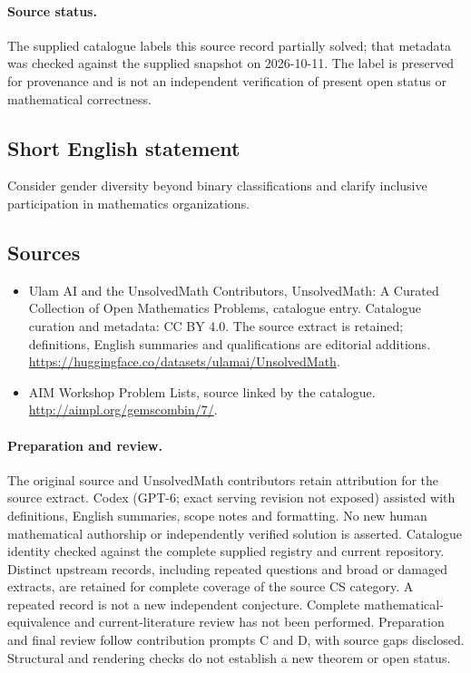 \documentclass[11pt]{article}
\begin{document}
\paragraph{Source status.}
The supplied catalogue labels this source record partially solved; that metadata was checked against the supplied snapshot on 2026-10-11. The label is preserved for provenance and is not an independent verification of present open status or mathematical correctness.
\subsection{Short English statement}
Consider gender diversity beyond binary classifications and clarify inclusive participation in mathematics organizations.
\subsection{Sources}
\begin{itemize}
\item[\hypertarget{source:statement:1}{S1}] Ulam AI and the UnsolvedMath Contributors, UnsolvedMath: A Curated Collection of Open Mathematics Problems, catalogue entry. Catalogue curation and metadata: CC BY 4.0. The source extract is retained; definitions, English summaries and qualifications are editorial additions.
\url{https://huggingface.co/datasets/ulamai/UnsolvedMath}.
\item[\hypertarget{source:statement:2}{S2}] AIM Workshop Problem Lists, source linked by the catalogue.
\url{http://aimpl.org/gemscombin/7/}.
\end{itemize}
\paragraph{Preparation and review.}
The original source and UnsolvedMath contributors retain attribution for the source extract. Codex (GPT-6; exact serving revision not exposed) assisted with definitions, English summaries, scope notes and formatting. No new human mathematical authorship or independently verified solution is asserted. Catalogue identity checked against the complete supplied registry and current repository. Distinct upstream records, including repeated questions and broad or damaged extracts, are retained for complete coverage of the source CS category. A repeated record is not a new independent conjecture. Complete mathematical-equivalence and current-literature review has not been performed. Preparation and final review follow contribution prompts C and D, with source gaps disclosed. Structural and rendering checks do not establish a new theorem or open status.
\label{end:statement}
\end{document}
